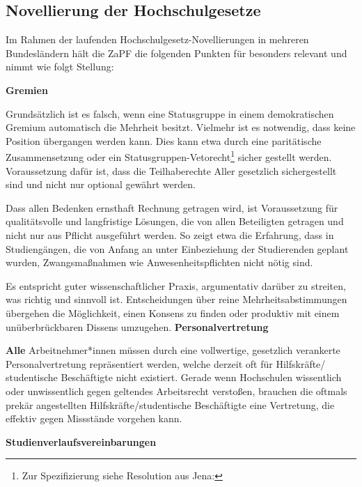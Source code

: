 
\subsection{Novellierung der Hochschulgesetze}

Im Rahmen der laufenden Hochschulgesetz-Novellierungen in mehreren Bundesländern hält die ZaPF die folgenden Punkten für besonders relevant und nimmt wie folgt Stellung:

\textbf{Gremien}

Grundsätzlich ist es falsch, wenn eine Statusgruppe in einem demokratischen Gremium automatisch die Mehrheit besitzt. Vielmehr ist es notwendig, dass keine Position übergangen werden kann. Dies kann etwa durch eine paritätische Zusammensetzung oder ein Statusgruppen-Vetorecht\footnote{Zur Spezifizierung siehe Resolution aus Jena: } %
sicher gestellt werden. Voraussetzung dafür ist, dass die Teilhaberechte Aller gesetzlich sichergestellt sind und nicht nur optional gewährt werden.

Dass allen Bedenken ernsthaft Rechnung getragen wird, ist Voraussetzung für qualitätsvolle und langfristige Lösungen, die von allen Beteiligten getragen und nicht nur aus Pflicht ausgeführt werden. So zeigt etwa die Erfahrung, dass in Studiengängen, die von Anfang an unter Einbeziehung der Studierenden geplant wurden, Zwangsmaßnahmen wie Anwesenheitspflichten nicht nötig sind.

Es entspricht guter wissenschaftlicher Praxis, argumentativ darüber zu streiten, was richtig und sinnvoll ist. Entscheidungen über reine Mehrheitsabstimmungen übergehen die Möglichkeit, einen Konsens zu finden oder produktiv mit einem unüberbrückbaren Dissens umzugehen.
\newpage
\textbf{Personalvertretung}

\textbf{Alle} Arbeitnehmer*innen müssen durch eine vollwertige, gesetzlich verankerte Personalvertretung repräsentiert werden, welche derzeit oft für Hilfskräfte/ studentische Beschäftigte nicht existiert. Gerade wenn Hochschulen wissentlich oder unwissentlich gegen geltendes Arbeitsrecht verstoßen, brauchen die oftmals prekär angestellten Hilfskräfte/studentische Beschäftigte eine Vertretung, die effektiv gegen Missstände vorgehen kann.

\textbf{Studienverlaufsvereinbarungen}

